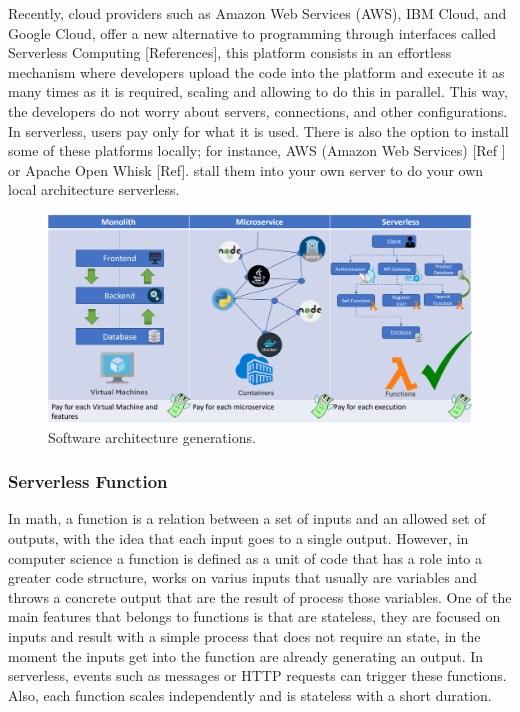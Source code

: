 \documentclass[runningheads]{llncs}
\begin{document}
Recently, cloud providers such as Amazon Web Services (AWS), IBM Cloud, and
Google Cloud, offer a new alternative to programming through interfaces called
Serverless Computing  [References], this platform consists in an effortless
mechanism where developers upload the code into the platform and execute it as
many times as it is required, scaling and allowing to do this in parallel. This
way, the developers do not worry about servers, connections, and other
configurations. In serverless, users pay only for what it is used. There is also
the option to install some of these platforms locally; for instance, AWS (Amazon Web Services)
[Ref ] or Apache Open Whisk [Ref]. stall them into your own server to do your
own local architecture serverless.

\begin{figure}[htp]
  \includegraphics[width=\textwidth]{img/architectures.png}
  \caption{Software architecture generations.} \label{fig1}
  \end{figure}

\subsubsection{Serverless Function} 
In math, a function is a relation between a set of inputs and an allowed set of
outputs, with the idea that each input goes to a single output. However, in
computer science a function is defined as a unit of code that has a role into a
greater code structure, works on varius inputs that usually are variables and throws a concrete
output that are the result of process those variables. One of the main features that belongs to
functions is that are stateless, they are focused on inputs and result with a simple process
that does not require an state, in the moment the inputs get into the function are already generating an output.  
In serverless,  events such as messages or HTTP requests can trigger these functions. 
Also, each function scales independently and is stateless with a short duration.
\end{document}
